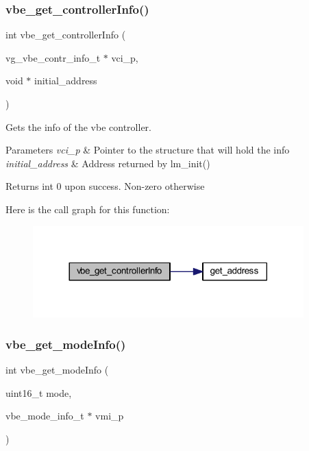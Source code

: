 \subsubsection{\texorpdfstring{vbe\+\_\+get\+\_\+controller\+Info()}{vbe\_get\_controllerInfo()}}
{\footnotesize\ttfamily int vbe\+\_\+get\+\_\+controller\+Info (\begin{DoxyParamCaption}\item[{vg\+\_\+vbe\+\_\+contr\+\_\+info\+\_\+t $\ast$}]{vci\+\_\+p,  }\item[{void $\ast$}]{initial\+\_\+address }\end{DoxyParamCaption})}



Gets the info of the vbe controller. 


\begin{DoxyParams}{Parameters}
{\em vci\+\_\+p} & Pointer to the structure that will hold the info \\
\hline
{\em initial\+\_\+address} & Address returned by lm\+\_\+init() \\
\hline
\end{DoxyParams}
\begin{DoxyReturn}{Returns}
int 0 upon success. Non-\/zero otherwise 
\end{DoxyReturn}
Here is the call graph for this function\+:\nopagebreak
\begin{figure}[H]
\begin{center}
\leavevmode
\includegraphics[width=296pt]{group__vbe_gac4f0e0f63a38a9fece2405ffac61618b_cgraph}
\end{center}
\end{figure}
\mbox{\label{group__vbe_ga9e78fdbbaab721c0b5075380a0688cff}} 
\subsubsection{\texorpdfstring{vbe\+\_\+get\+\_\+mode\+Info()}{vbe\_get\_modeInfo()}}
{\footnotesize\ttfamily int vbe\+\_\+get\+\_\+mode\+Info (\begin{DoxyParamCaption}\item[{uint16\+\_\+t}]{mode,  }\item[{vbe\+\_\+mode\+\_\+info\+\_\+t $\ast$}]{vmi\+\_\+p }\end{DoxyParamCaption})}



